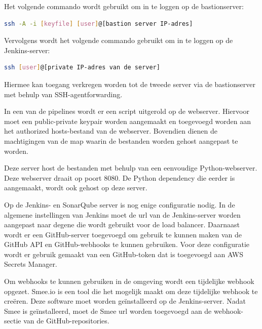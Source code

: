 Het volgende commando wordt gebruikt om in te loggen op de bastionserver:
\newline

\begin{lstlisting}[language=bash, style=bashstyle]
  ssh -A -i [keyfile] [user]@[bastion server IP-adres]
\end{lstlisting}

\vspace{0.5cm}
Vervolgens wordt het volgende commando gebruikt om in te loggen op de \newline Jenkins-server:
\newline

\begin{lstlisting}[language=bash, style=bashstyle]
  ssh [user]@[private IP-adres van de server]
\end{lstlisting}

\vspace{0.5cm}
Hiermee kan toegang verkregen worden tot de tweede server via de bastionserver met behulp van SSH-agentforwarding.
\newline

In een van de pipelines wordt er een script uitgerold op de webserver. Hiervoor moet een public-private keypair worden aangemaakt en toegevoegd worden aan het authorized hosts-bestand van de webserver. Bovendien dienen de machtigingen van de map waarin de bestanden worden gehost aangepast te worden.
\newline

Deze server host de bestanden met behulp van een eenvoudige Python-webserver. Deze webserver draait op poort 8080. De Python dependency die eerder is aangemaakt, wordt ook gehost op deze server.
\newline

Op de Jenkins- en SonarQube server is nog enige configuratie nodig. In de algemene instellingen van Jenkins moet de url van de Jenkins-server worden aangepast naar degene die wordt gebruikt voor de load balancer. Daarnaast wordt er een GitHub-server toegevoegd om gebruik te kunnen maken van de GitHub API en GitHub-webhooks te kunnen gebruiken. Voor deze configuratie wordt er gebruik gemaakt van een GitHub-token dat is toegevoegd aan AWS Secrets Manager.
\newline

Om webhooks te kunnen gebruiken in de omgeving wordt een tijdelijke webhook opgezet. Smee.io is een tool die het mogelijk maakt om deze tijdelijke webhook te creëren. Deze software moet worden geïnstalleerd op de Jenkins-server. Nadat Smee is geïnstalleerd, moet de Smee url worden toegevoegd aan de webhook-sectie van de GitHub-repositories. 
\newline

